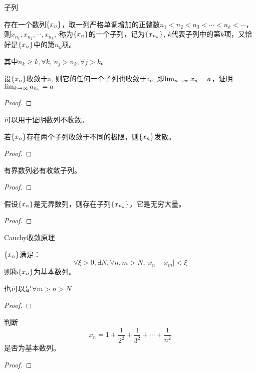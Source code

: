 \documentclass[lang=cn]{elegantbook}
\begin{document}
子列
\begin{definition}
    存在一个数列$\left\{ x_n\right\}$，取一列严格单调增加的正整数$n_1 < n_2 < n_3 < \cdots < n_k < \cdots$，则$x_{n_1}, x_{n_2}, \cdots, x_{n_k}, \cdot$称为$\left\{ x_n\right\}$的一个子列，记为$\left\{ x_{n_k}\right\}$, $k$代表子列中的第$k$项，又恰好是$\left\{ x_n\right\}$中的第$n_k$项。
\end{definition}
其中$n_k \ge k, \forall k$, $n_j > n_k, \forall j > k$。
\begin{theorem}
    设$\left\{ x_n\right\}$收敛于a, 则它的任何一个子列也收敛于a。即$\lim_{n \to \infty } x_n = a$，证明$\lim_{k \to \infty } a_{n_k} = a$
\end{theorem}
\begin{proof}

\end{proof}
可以用于证明数列不收敛。
\begin{proposition}
    若$\left\{ x_n\right\}$存在两个子列收敛于不同的极限，则$\left\{ x_n\right\}$发散。
\end{proposition}
\begin{proof}

\end{proof}

\begin{theorem}
    有界数列必有收敛子列。
\end{theorem}
\begin{proof}
    
\end{proof}

\begin{theorem}
    假设$\left\{ x_n\right\}$是无界数列，则存在子列$\left\{ x_{n_k}\right\}$，它是无穷大量。
\end{theorem}
\begin{proof}
    
\end{proof}

Cauchy收敛原理

\begin{definition}
    $\left\{ x_n\right\}$满足：
    \[\forall \xi > 0, \exists N, \forall n, m > N, \left|x_n - x_m\right| < \xi \]
    则称$\left\{ x_n\right\}$为基本数列。
\end{definition}
也可以是$\forall m > n > N$
\begin{proof}
\end{proof}

\begin{proposition}
    判断
    \[ x_n = 1 + \frac{1}{2^2} + \frac{1}{3^2} + \cdots + \frac{1}{n^2} \]
    是否为基本数列。
\end{proposition}
\begin{proof}

\end{proof}
\end{document}
